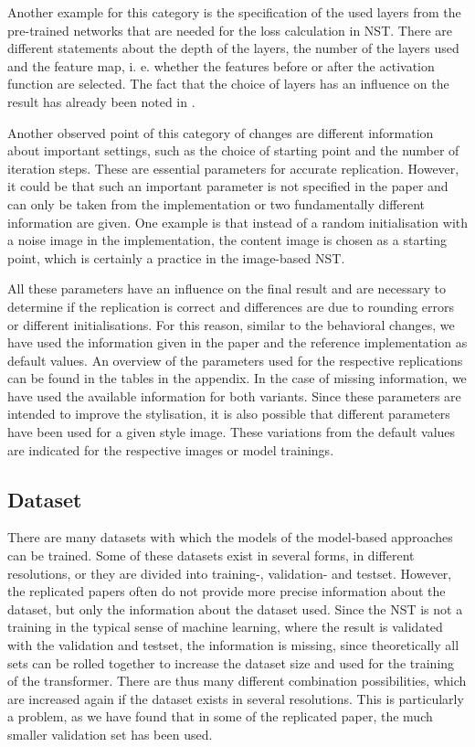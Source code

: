 Another example for this category is the specification of the used layers from the pre-trained networks that are needed for the loss calculation in NST. There are different statements about the depth of the layers, the number of the layers used and the feature map, i. e. whether the features before or after the activation function are selected. The fact that the choice of layers has an influence on the result has already been noted in \cite{GEB2016}.

Another observed point of this category of changes are different information about important settings, such as the choice of starting point and the number of iteration steps. These are essential parameters for accurate replication. However, it could be that such an important parameter is not specified in the paper and can only be taken from the implementation or two fundamentally different information are given. One example is that instead of a random initialisation with a noise image in the implementation, the content image is chosen as a starting point, which is certainly a practice in the image-based NST. 

All these parameters have an influence on the final result and are necessary to determine if the replication is correct and differences are due to rounding errors or different initialisations. For this reason, similar to the behavioral changes, we have used the information given in the paper and the reference implementation as default values. An overview of the parameters used for the respective replications can be found in the tables in the appendix. In the case of missing information, we have used the available information for both variants. Since these parameters are intended to improve the stylisation, it is also possible that different parameters have been used for a given style image. These variations from the default values are indicated for the respective images or model trainings.

\subsection{Dataset}

There are many datasets with which the models of the model-based approaches can be trained. Some of these datasets exist in several forms, in different resolutions, or they are divided into training-, validation- and testset. However, the replicated papers often do not provide more precise information about the dataset, but only the information about the dataset used. Since the NST is not a training in the typical sense of machine learning, where the result is validated with the validation and testset, the information is missing, since theoretically all sets can be rolled together to increase the dataset size and used for the training of the transformer. There are thus many different combination possibilities, which are increased again if the dataset exists in several resolutions. This is particularly a problem, as we have found that in some of the replicated paper, the much smaller validation set has been used.

